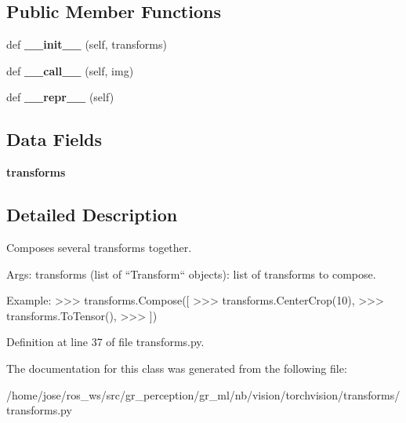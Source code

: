 \subsection*{Public Member Functions}
\begin{DoxyCompactItemize}
\item 
\mbox{\label{classtorchvision_1_1transforms_1_1transforms_1_1Compose_a5aca785c0d1e949761c0e82fd63a4ea3}} 
def {\bfseries \+\_\+\+\_\+init\+\_\+\+\_\+} (self, transforms)
\item 
\mbox{\label{classtorchvision_1_1transforms_1_1transforms_1_1Compose_a29b1877847bee9580397a98c3d1e769e}} 
def {\bfseries \+\_\+\+\_\+call\+\_\+\+\_\+} (self, img)
\item 
\mbox{\label{classtorchvision_1_1transforms_1_1transforms_1_1Compose_a26d9459ac7d9e44fc15e14391a0dafe5}} 
def {\bfseries \+\_\+\+\_\+repr\+\_\+\+\_\+} (self)
\end{DoxyCompactItemize}
\subsection*{Data Fields}
\begin{DoxyCompactItemize}
\item 
\mbox{\label{classtorchvision_1_1transforms_1_1transforms_1_1Compose_ab8482436d1fae639ed2b812b56011c39}} 
{\bfseries transforms}
\end{DoxyCompactItemize}


\subsection{Detailed Description}
\begin{DoxyVerb}Composes several transforms together.

Args:
    transforms (list of ``Transform`` objects): list of transforms to compose.

Example:
    >>> transforms.Compose([
    >>>     transforms.CenterCrop(10),
    >>>     transforms.ToTensor(),
    >>> ])
\end{DoxyVerb}
 

Definition at line 37 of file transforms.\+py.



The documentation for this class was generated from the following file\+:\begin{DoxyCompactItemize}
\item 
/home/jose/ros\+\_\+ws/src/gr\+\_\+perception/gr\+\_\+ml/nb/vision/torchvision/transforms/transforms.\+py\end{DoxyCompactItemize}
